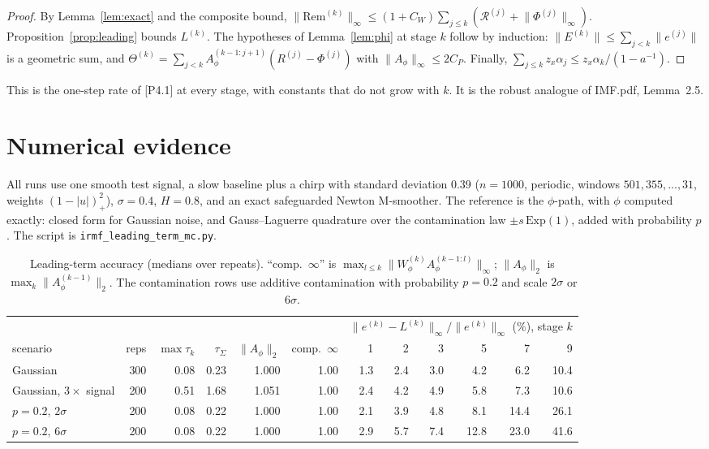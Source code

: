 \documentclass[11pt]{article}
\newcommand{\norm}[1]{\lVert#1\rVert}
\newcommand{\Rem}{\mathrm{Rem}}
\theoremstyle{definition}
\begin{document}
\begin{proof}
By Lemma~\ref{lem:exact} and the composite bound,
\(\norm{\Rem^{(k)}}_\infty\le(1+C_W)\sum_{j\le k}(\mathcal R^{(j)}+\norm{\Phi^{(j)}}_\infty)\).
Proposition~\ref{prop:leading} bounds \(L^{(k)}\).  The hypotheses of
Lemma~\ref{lem:phi} at stage \(k\) follow by induction:
\(\norm{E^{(k)}}\le\sum_{j<k}\norm{e^{(j)}}\) is a geometric sum, and
\(\Theta^{(k)}=\sum_{j<k}A^{(k-1:j+1)}_\phi(R^{(j)}-\Phi^{(j)})\) with
\(\norm{A_\phi}_\infty\le2C_P\).  Finally,
\(\sum_{j\le k}z_x\alpha_j\le z_x\alpha_k/(1-a^{-1})\).
\end{proof}

This is the one-step rate of [P4.1] at every stage, with constants that do
not grow with \(k\).  It is the robust analogue of IMF.pdf, Lemma~2.5.

\section{Numerical evidence}\label{sec:numerics}

All runs use one smooth test signal, a slow baseline plus a chirp with standard deviation 0.39 (\(n=1000\), periodic, windows
\(501,355,\dots,31\), weights \((1-|u|)_+^2\)), \(\sigma=0.4\), \(H=0.8\),
and an exact safeguarded Newton M-smoother.  The reference is the
\(\phi\)-path, with \(\phi\) computed exactly: closed form for Gaussian noise,
and Gauss--Laguerre quadrature over the contamination law
\(\pm s\,\mathrm{Exp}(1)\), added with probability \(p\).  The script is
\texttt{irmf\_leading\_term\_mc.py}.

\begin{table}[h]\centering\small\setlength\tabcolsep{3.5pt}
\begin{tabular}{lrrrrr|rrrrrr}
\toprule
 & & & & & & \multicolumn{6}{c}{\(\norm{e^{(k)}-L^{(k)}}_\infty/\norm{e^{(k)}}_\infty\) (\%), stage \(k\)}\\
scenario & reps & \(\max\tau_k\) & \(\tau_\Sigma\) & \(\norm{A_\phi}_2\) & comp.\ \(\infty\) & 1 & 2 & 3 & 5 & 7 & 9\\
\midrule
Gaussian & 300 & 0.08 & 0.23 & 1.000 & 1.00 & 1.3 & 2.4 & 3.0 & 4.2 & 6.2 & 10.4 \\
Gaussian, $3\times$ signal & 200 & 0.51 & 1.68 & 1.051 & 1.00 & 2.4 & 4.2 & 4.9 & 5.8 & 7.3 & 10.6 \\
$p=0.2$, $2\sigma$ & 200 & 0.08 & 0.22 & 1.000 & 1.00 & 2.1 & 3.9 & 4.8 & 8.1 & 14.4 & 26.1 \\
$p=0.2$, $6\sigma$ & 200 & 0.08 & 0.22 & 1.000 & 1.00 & 2.9 & 5.7 & 7.4 & 12.8 & 23.0 & 41.6 \\
\bottomrule
\end{tabular}
\caption{Leading-term accuracy (medians over repeats).  ``comp.\ \(\infty\)''
is \(\max_{l\le k}\norm{W^{(k)}_\phi A^{(k-1:l)}_\phi}_\infty\);
\(\norm{A_\phi}_2\) is \(\max_k\norm{A^{(k-1)}_\phi}_2\).  The contamination
rows use additive contamination with probability \(p=0.2\) and scale
\(2\sigma\) or \(6\sigma\).}
\end{table}
\end{document}

